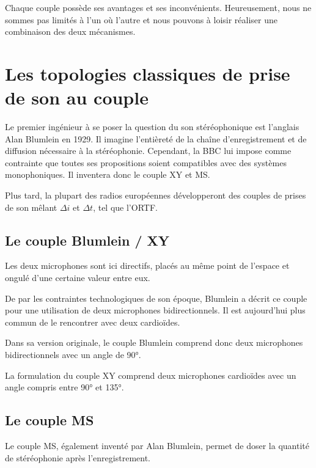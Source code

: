 \documentclass[
  letterpaper,
  DIV=11,
  numbers=noendperiod]{scrreprt}
\begin{document}
Chaque couple possède ses avantages et ses inconvénients. Heureusement,
nous ne sommes pas limités à l'un où l'autre et nous pouvons à loisir
réaliser une combinaison des deux mécanismes.

\hypertarget{les-topologies-classiques-de-prise-de-son-au-couple}{%
\section{Les topologies classiques de prise de son au
couple}\label{les-topologies-classiques-de-prise-de-son-au-couple}}

Le premier ingénieur à se poser la question du son stéréophonique est
l'anglais Alan Blumlein en 1929. Il imagine l'entièreté de la chaîne
d'enregistrement et de diffusion nécessaire à la stéréophonie.
Cependant, la BBC lui impose comme contrainte que toutes ses
propositions soient compatibles avec des systèmes monophoniques. Il
inventera donc le couple XY et MS.

Plus tard, la plupart des radios européennes développeront des couples
de prises de son mêlant \(\Delta i\) et \(\Delta t\), tel que l'ORTF.

\hypertarget{le-couple-blumlein-xy}{%
\subsection{Le couple Blumlein / XY}\label{le-couple-blumlein-xy}}

Les deux microphones sont ici directifs, placés au même point de
l'espace et ongulé d'une certaine valeur entre eux.

De par les contraintes technologiques de son époque, Blumlein a décrit
ce couple pour une utilisation de deux microphones bidirectionnels. Il
est aujourd'hui plus commun de le rencontrer avec deux cardioïdes.

Dans sa version originale, le couple Blumlein comprend donc deux
microphones bidirectionnels avec un angle de 90°.

La formulation du couple XY comprend deux microphones cardioïdes avec un
angle compris entre 90° et 135°.

\hypertarget{le-couple-ms}{%
\subsection{Le couple MS}\label{le-couple-ms}}

Le couple MS, également inventé par Alan Blumlein, permet de doser la
quantité de stéréophonie après l'enregistrement.
\end{document}
